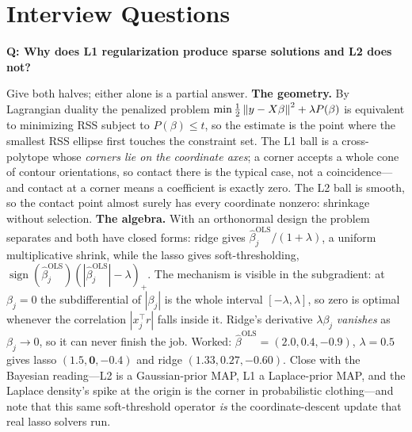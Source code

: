 \section{Interview Questions}
\label{cml:sec:supervised_interview}

\begin{interviewq}
\textbf{Q: Why does L1 regularization produce sparse solutions and L2 does not?}

 \quad {} \quad \badgefreq{\freqhigh}

\stronganswer

Give both halves; either alone is a partial answer. \textbf{The geometry.} By Lagrangian duality the penalized problem $\min \tfrac12\left\lVert y-X\beta\right\rVert^2 + \lambda P(\beta)$ is equivalent to minimizing RSS subject to $P(\beta) \le t$, so the estimate is the point where the smallest RSS ellipse first touches the constraint set. The L1 ball is a cross-polytope whose \emph{corners lie on the coordinate axes}; a corner accepts a whole cone of contour orientations, so contact there is the typical case, not a coincidence---and contact at a corner means a coefficient is exactly zero. The L2 ball is smooth, so the contact point almost surely has every coordinate nonzero: shrinkage without selection. \textbf{The algebra.} With an orthonormal design the problem separates and both have closed forms: ridge gives $\hat\beta_j^{\text{OLS}}/(1+\lambda)$, a uniform multiplicative shrink, while the lasso gives soft-thresholding, $\operatorname{sign}(\hat\beta_j^{\text{OLS}})(|\hat\beta_j^{\text{OLS}}|-\lambda)_+$. The mechanism is visible in the subgradient: at $\beta_j=0$ the subdifferential of $|\beta_j|$ is the whole interval $[-\lambda,\lambda]$, so zero is optimal whenever the correlation $|x_j^{\top}r|$ falls inside it. Ridge's derivative $\lambda\beta_j$ \emph{vanishes} as $\beta_j\to 0$, so it can never finish the job. Worked: $\hat\beta^{\text{OLS}}=(2.0,0.4,-0.9)$, $\lambda=0.5$ gives lasso $(1.5,\mathbf{0},-0.4)$ and ridge $(1.33,0.27,-0.60)$. Close with the Bayesian reading---L2 is a Gaussian-prior MAP, L1 a Laplace-prior MAP, and the Laplace density's spike at the origin is the corner in probabilistic clothing---and note that this same soft-threshold operator \emph{is} the coordinate-descent update that real lasso solvers run.


\end{interviewq}

